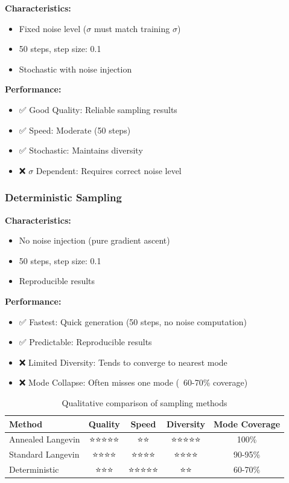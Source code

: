 \documentclass[12pt,a4paper]{article}
\begin{document}
\textbf{Characteristics:}
\begin{itemize}
    \item Fixed noise level ($\sigma$ must match training $\sigma$)
    \item 50 steps, step size: 0.1
    \item Stochastic with noise injection
\end{itemize}

\textbf{Performance:}
\begin{itemize}
    \item ✅ Good Quality: Reliable sampling results
    \item ✅ Speed: Moderate (50 steps)
    \item ✅ Stochastic: Maintains diversity
    \item ❌ $\sigma$ Dependent: Requires correct noise level
\end{itemize}

\subsubsection{Deterministic Sampling}

\textbf{Characteristics:}
\begin{itemize}
    \item No noise injection (pure gradient ascent)
    \item 50 steps, step size: 0.1
    \item Reproducible results
\end{itemize}

\textbf{Performance:}
\begin{itemize}
    \item ✅ Fastest: Quick generation (50 steps, no noise computation)
    \item ✅ Predictable: Reproducible results
    \item ❌ Limited Diversity: Tends to converge to nearest mode
    \item ❌ Mode Collapse: Often misses one mode (~60-70\% coverage)
\end{itemize}

\begin{table}[H]
\centering
\begin{tabular}{lcccc}
\toprule
Method & Quality & Speed & Diversity & Mode Coverage \\
\midrule
Annealed Langevin & ⭐⭐⭐⭐⭐ & ⭐⭐ & ⭐⭐⭐⭐⭐ & 100\% \\
Standard Langevin & ⭐⭐⭐⭐ & ⭐⭐⭐⭐ & ⭐⭐⭐⭐ & 90-95\% \\
Deterministic & ⭐⭐⭐ & ⭐⭐⭐⭐⭐ & ⭐⭐ & 60-70\% \\
\bottomrule
\end{tabular}
\caption{Qualitative comparison of sampling methods}
\label{tab:sampling_comparison}
\end{table}
\end{document}
